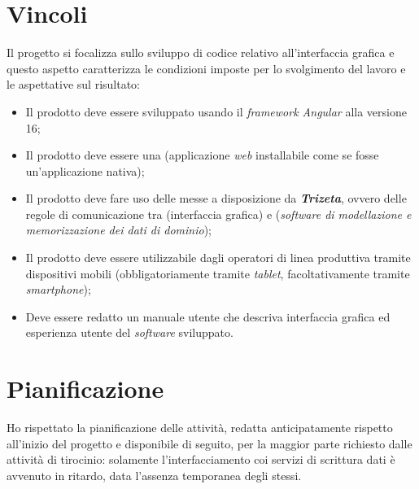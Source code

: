 \section{Vincoli}

Il progetto si focalizza sullo sviluppo di codice relativo all'interfaccia grafica e questo aspetto caratterizza le condizioni imposte per lo svolgimento del lavoro e le aspettative sul risultato:
\begin{itemize}
    \item Il prodotto deve essere sviluppato usando il \textit{framework Angular} alla versione 16;
    \item Il prodotto deve essere una  (applicazione \textit{web} installabile come se fosse un'applicazione nativa);
    \item Il prodotto deve fare uso delle  messe a disposizione da \textit{\textbf{Trizeta}}, ovvero delle regole di comunicazione tra  (interfaccia grafica) e  (\textit{software di modellazione e memorizzazione dei dati di dominio});
    \item Il prodotto deve essere utilizzabile dagli operatori di linea produttiva tramite dispositivi mobili (obbligatoriamente tramite \textit{tablet}, facoltativamente tramite \textit{smartphone});
    \item Deve essere redatto un manuale utente che  descriva interfaccia grafica ed esperienza utente del \textit{software} sviluppato.
\end{itemize}

\section{Pianificazione}
Ho rispettato la pianificazione delle attività, redatta anticipatamente rispetto all'inizio del progetto e disponibile di seguito, per la maggior parte  richiesto dalle attività di tirocinio: solamente l'interfacciamento coi servizi
di scrittura dati è avvenuto in ritardo, data l'assenza temporanea degli stessi.

